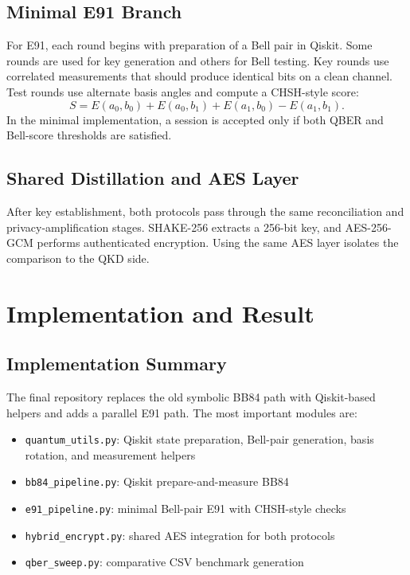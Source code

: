 \documentclass[conference]{IEEEtran}
\begin{document}
\subsection{Minimal E91 Branch}
For E91, each round begins with preparation of a Bell pair in Qiskit. Some rounds are used for key generation and others for Bell testing. Key rounds use correlated measurements that should produce identical bits on a clean channel. Test rounds use alternate basis angles and compute a CHSH-style score:
\begin{equation}
S = E(a_0,b_0) + E(a_0,b_1) + E(a_1,b_0) - E(a_1,b_1).
\end{equation}
In the minimal implementation, a session is accepted only if both QBER and Bell-score thresholds are satisfied.

\subsection{Shared Distillation and AES Layer}
After key establishment, both protocols pass through the same reconciliation and privacy-amplification stages. SHAKE-256 extracts a 256-bit key, and AES-256-GCM performs authenticated encryption. Using the same AES layer isolates the comparison to the QKD side.

\section{Implementation and Result}
\subsection{Implementation Summary}
The final repository replaces the old symbolic BB84 path with Qiskit-based helpers and adds a parallel E91 path. The most important modules are:
\begin{itemize}
\item \texttt{quantum\_utils.py}: Qiskit state preparation, Bell-pair generation, basis rotation, and measurement helpers
\item \texttt{bb84\_pipeline.py}: Qiskit prepare-and-measure BB84
\item \texttt{e91\_pipeline.py}: minimal Bell-pair E91 with CHSH-style checks
\item \texttt{hybrid\_encrypt.py}: shared AES integration for both protocols
\item \texttt{qber\_sweep.py}: comparative CSV benchmark generation
\end{itemize}
\end{document}
